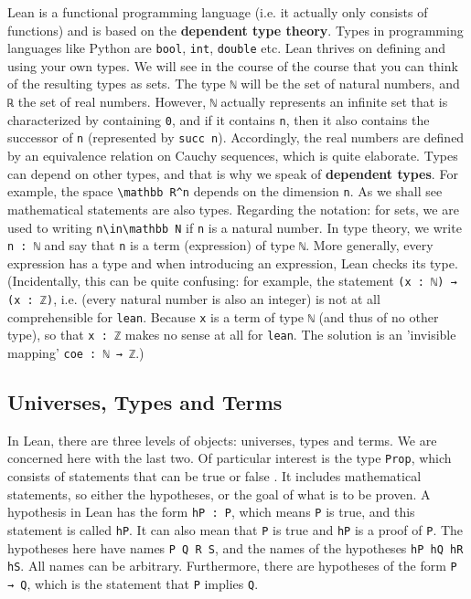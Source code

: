 \documentclass{memoir}
\begin{document}
Lean is a functional programming language (i.e. it actually only consists of functions) and is based on the \textbf{dependent type theory}. Types in programming languages like Python are \Verb|bool|, \Verb|int|, \Verb|double| etc. Lean thrives on defining and using your own types. We will see in the course of the course that you can think of the resulting types as sets. The type \Verb|ℕ| will be the set of natural numbers, and \Verb|ℝ| the set of real numbers. However, \Verb|ℕ| actually represents an infinite set that is characterized by containing \Verb|0|, and if it contains \Verb|n|, then it also contains the successor of \Verb|n| (represented by \Verb|succ n|). Accordingly, the real numbers are defined by an equivalence relation on Cauchy sequences,  which is quite elaborate. Types can depend on other types, and that is why we speak of \textbf{dependent types}. For example, the space \Verb|\mathbb R^n| depends on the dimension \Verb|n|. As we shall see mathematical statements are also types. Regarding the notation: for sets, we are used to writing \Verb|n\in\mathbb N| if \Verb|n| is a natural number. In type theory, we write \Verb|n : ℕ| and say that \Verb|n| is a term (expression) of type \Verb|ℕ|. More generally, every expression has a type and when introducing an expression, Lean checks its type. (Incidentally, this can be quite confusing: for example, the statement \Verb|(x : ℕ) → (x : ℤ)|, i.e. (every natural number is also an integer) is not at all comprehensible for \Verb|lean|. Because \Verb|x| is a term of type \Verb|ℕ| (and thus of no other type), so that \Verb|x : ℤ| makes no sense at all for \Verb|lean|. The solution is an 'invisible mapping' \Verb|coe : ℕ → ℤ|.)



\subsection{Universes, Types and Terms}

In Lean, there are three levels of objects: universes, types and terms. We are concerned here with the last two. Of particular interest is the type \Verb|Prop|, which consists of statements that can be true or false . It includes mathematical statements, so either the hypotheses, or the goal of what is to be proven. A hypothesis in Lean has the form \Verb|hP : P|, which means \Verb|P| is true, and this statement is called \Verb|hP|. It can also mean that \Verb|P| is true and \Verb|hP| is a proof of \Verb|P|. The hypotheses here have names \Verb|P Q R S|, and the names of the hypotheses \Verb|hP hQ hR hS|. All names can be arbitrary. Furthermore, there are hypotheses of the form \Verb|P → Q|, which is the statement that \Verb|P| implies \Verb|Q|.
\end{document}
